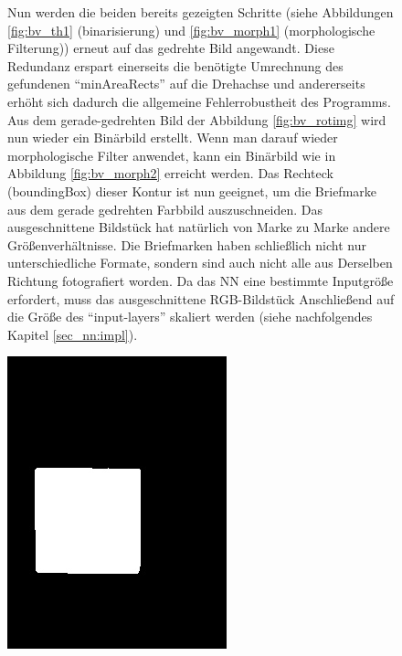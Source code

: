 \documentclass[12pt,toc=bib,toc=listof]{scrreprt}
\begin{document}
\begin{figure}[h]
\begin{minipage}[t]{.75\linewidth}
Nun werden die beiden bereits gezeigten Schritte (siehe Abbildungen \ref{fig:bv_th1} (binarisierung) und \ref{fig:bv_morph1} (morphologische Filterung)) erneut auf das gedrehte Bild angewandt. Diese Redundanz erspart einerseits die benötigte Umrechnung des gefundenen ``minAreaRects'' auf die Drehachse und andererseits erhöht sich dadurch die allgemeine Fehlerrobustheit des Programms.\\
Aus dem gerade-gedrehten Bild der Abbildung \ref{fig:bv_rotimg} wird nun wieder ein Binärbild erstellt. Wenn man darauf wieder morphologische Filter anwendet, kann ein Binärbild wie in Abbildung \ref{fig:bv_morph2} erreicht werden. Das Rechteck (boundingBox) dieser Kontur ist nun geeignet, um die Briefmarke aus dem gerade gedrehten Farbbild auszuschneiden. Das ausgeschnittene Bildstück hat natürlich von Marke zu Marke andere Größenverhältnisse. Die Briefmarken haben schließlich nicht nur unterschiedliche Formate, sondern sind auch nicht alle aus Derselben Richtung fotografiert worden. Da das NN eine bestimmte Inputgröße erfordert, muss das ausgeschnittene RGB-Bildstück Anschließend auf die Größe des ``input-layers'' skaliert werden (siehe nachfolgendes Kapitel \ref{sec_nn:impl}).
\end{minipage}
\hfill
\begin{minipage}[t]{.2\linewidth}
\strut\vspace*{-\baselineskip}
\newline
  \includegraphics[width=\linewidth]{./../bilder/bin2morph}

\end{minipage}
\end{figure}
\end{document}
